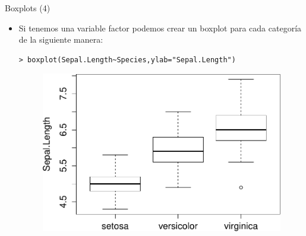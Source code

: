\documentclass[handout]{beamer}
\begin{document}
\begin{frame}[fragile]{Boxplots (4)}
\scriptsize{
\begin{itemize}

\item Si tenemos una variable factor podemos crear un boxplot para cada categoría de la siguiente manera:
\begin{verbatim}
> boxplot(Sepal.Length~Species,ylab="Sepal.Length")
\end{verbatim}

 \begin{figure}[h!]
	\centering
	\includegraphics[scale=0.5]{imagenes/boxplotfactor.pdf}		
\end{figure} 
 
\end{itemize}

}
\end{frame}
\end{document}
